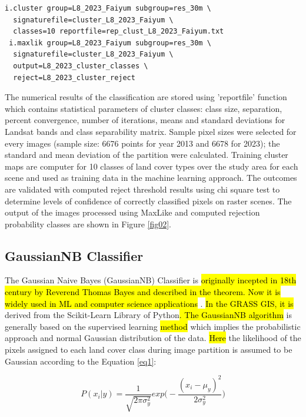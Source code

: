 \documentclass[final,5p,times,twocolumn]{elsarticle}
\begin{document}
\begin{footnotesize}
\begin{verbatim}
i.cluster group=L8_2023_Faiyum subgroup=res_30m \
  signaturefile=cluster_L8_2023_Faiyum \
  classes=10 reportfile=rep_clust_L8_2023_Faiyum.txt
 i.maxlik group=L8_2023_Faiyum subgroup=res_30m \
  signaturefile=cluster_L8_2023_Faiyum \
  output=L8_2023_cluster_classes \
  reject=L8_2023_cluster_reject
\end{verbatim}
\end{footnotesize}

The numerical results of the classification are stored using 'reportfile' function which contains statistical parameters of cluster classes: class size, separation, percent convergence, number of iterations, means and standard deviations for Landsat bands and class separability matrix. Sample pixel sizes were selected for every images (sample size: 6676 points for year 2013 and 6678 for 2023); the standard and mean deviation of the partition were calculated. Training cluster maps are computer for 10 classes of land cover types over the study area for each scene and used as training data in the machine learning approach. The outcomes are validated with computed reject threshold results using chi square test to determine levels of confidence of correctly classified pixels on raster scenes. The output of the images processed using MaxLike and computed rejection probability classes are shown in Figure \ref{fig02}.

\subsection{GaussianNB Classifier}

The Gaussian Naive Bayes (GaussianNB) Classifier is \hl{originally incepted in 18th century by Reverend Thomas Bayes and described in the theorem. Now it is widely used in ML and computer science applications} \cite{Chanetal1982}. \hl{In the GRASS GIS, it is }derived from the Scikit-Learn Library of Python\hl{. The GaussianNB algorithm} is generally based on the supervised learning \hl{method} which implies the probabilistic approach and normal Gaussian distribution of the data. \hl{Here }the likelihood of the pixels assigned to each land cover class during image partition is assumed to be Gaussian according to the Equation \ref{eq1}:

\begin{equation}
P(x_{i} | y)=\frac{1}{\sqrt{2\pi\sigma^2_y}}exp\biggl( -\frac{(x_{i}-\mu_{y})^2}{2\sigma^2_y}\biggr)
\label{eq1}
\end{equation}
\end{document}
